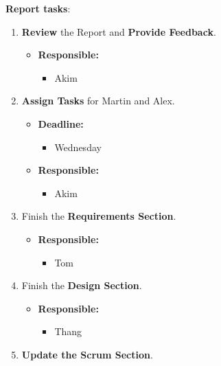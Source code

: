 \documentclass[11pt]{article}
\begin{document}
\textbf{Report tasks}:

\begin{enumerate}
\def\labelenumi{\arabic{enumi}.}
\setcounter{enumi}{5}
\tightlist
\item
  \textbf{Review} the Report and \textbf{Provide Feedback}.

  \begin{itemize}
  \tightlist
  \item
    \textbf{Responsible:}

    \begin{itemize}
    \tightlist
    \item
      Akim
    \end{itemize}
  \end{itemize}
\item
  \textbf{Assign Tasks} for Martin and Alex.

  \begin{itemize}
  \tightlist
  \item
    \textbf{Deadline:}

    \begin{itemize}
    \tightlist
    \item
      Wednesday
    \end{itemize}
  \item
    \textbf{Responsible:}

    \begin{itemize}
    \tightlist
    \item
      Akim
    \end{itemize}
  \end{itemize}
\item
  Finish the \textbf{Requirements Section}.

  \begin{itemize}
  \tightlist
  \item
    \textbf{Responsible:}

    \begin{itemize}
    \tightlist
    \item
      Tom
    \end{itemize}
  \end{itemize}
\item
  Finish the \textbf{Design Section}.

  \begin{itemize}
  \tightlist
  \item
    \textbf{Responsible:}

    \begin{itemize}
    \tightlist
    \item
      Thang
    \end{itemize}
  \end{itemize}
\item
  \textbf{Update the Scrum Section}.


\end{enumerate}
\end{document}
